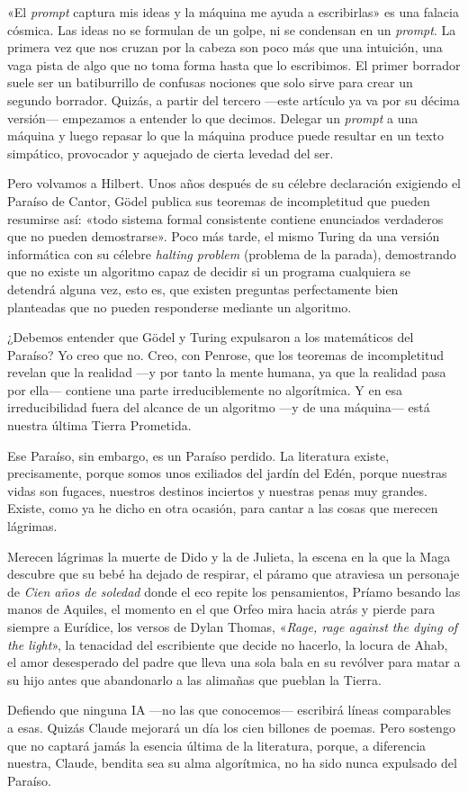 \documentclass[11pt,a4paper]{article}
\begin{document}
«El \emph{prompt} captura mis ideas y la máquina me ayuda a escribirlas» es una falacia cósmica. Las ideas no se formulan de un golpe, ni se condensan en un \emph{prompt}. La primera vez que nos cruzan por la cabeza son poco más que una intuición, una vaga pista de algo que no toma forma hasta que lo escribimos. El primer borrador suele ser un batiburrillo de confusas nociones que solo sirve para crear un segundo borrador. Quizás, a partir del tercero ---este artículo ya va por su décima versión--- empezamos a entender lo que decimos. Delegar un \emph{prompt} a una máquina y luego repasar lo que la máquina produce puede resultar en un texto simpático, provocador y aquejado de cierta levedad del ser. 

Pero volvamos a Hilbert. Unos años después de su célebre declaración exigiendo el Paraíso de Cantor, Gödel publica sus teoremas de incompletitud que pueden resumirse así: «todo sistema formal consistente contiene enunciados verdaderos que no pueden demostrarse». Poco más tarde, el mismo Turing da una versión informática con su célebre \emph{halting problem} (problema de la parada), demostrando que no existe un algoritmo capaz de decidir si un programa cualquiera se detendrá alguna vez, esto es, que existen preguntas perfectamente bien planteadas que no pueden responderse mediante un algoritmo. 

¿Debemos entender que Gödel y Turing expulsaron a los matemáticos del Paraíso? Yo creo que no. Creo, con Penrose, que los teoremas de incompletitud revelan que la realidad ---y por tanto la mente humana, ya que la realidad pasa por ella--- contiene una parte irreduciblemente no algorítmica. Y en esa irreducibilidad fuera del alcance de un algoritmo ---y de una máquina--- está nuestra última Tierra Prometida.

Ese Paraíso, sin embargo, es un Paraíso perdido. La literatura existe, precisamente, porque somos unos exiliados del jardín del Edén, porque nuestras vidas son fugaces, nuestros destinos inciertos y nuestras penas muy grandes. Existe, como ya he dicho en otra ocasión, para cantar a las cosas que merecen lágrimas. 

Merecen lágrimas la muerte de Dido y la de Julieta, la escena en la que la Maga descubre que su bebé ha dejado de respirar, el páramo que atraviesa un personaje de \emph{Cien años de soledad} donde el eco repite los pensamientos, Príamo besando las manos de Aquiles, el momento en el que Orfeo mira hacia atrás y pierde para siempre a Eurídice, los versos de Dylan Thomas, «\emph{Rage, rage against the dying of the light}», la tenacidad del escribiente que decide no hacerlo, la locura de Ahab, el amor desesperado del padre que lleva una sola bala en su revólver para matar a su hijo antes que abandonarlo a las alimañas que pueblan la Tierra.

Defiendo que ninguna IA ---no las que conocemos--- escribirá líneas comparables a esas. 
Quizás Claude mejorará un día los cien billones de poemas. Pero sostengo que no captará jamás la esencia última de la literatura, porque, a diferencia nuestra, Claude, bendita sea su alma algorítmica, no ha sido nunca expulsado del Paraíso. 
\end{document}
